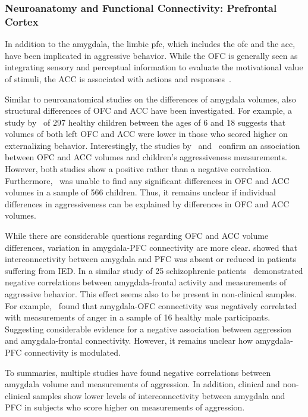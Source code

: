 \subsubsection{Neuroanatomy and Functional Connectivity: Prefrontal Cortex}
\label{ssub:aggression_and_the_prefrontal_cortex}

In addition to the amygdala, the limbic \acrfull{pfc}, which includes the \acrfull{ofc} and the \acrfull{acc}, have been implicated in aggressive behavior.
While the OFC is generally seen as integrating sensory and perceptual information to evaluate the motivational value of stimuli, the ACC is associated with actions and responses~\cite{Rudebeck2014,Walton2007}.

Similar to neuroanatomical studies on the differences of amygdala volumes, also structural differences of OFC and ACC have been investigated.
For example, a study by~\citet{Ameis2014} of $297$ healthy children between the ages of 6 and 18 suggests that volumes of both left OFC and ACC were lower in those who scored higher on externalizing behavior.
Interestingly, the studies by~\citet{Ducharme2011} and~\citet{Boes2008} confirm an association between OFC and ACC volumes and children's aggressiveness measurements.
However, both studies show a positive rather than a negative correlation.
Furthermore,~\citet{Thijssen2015} was unable to find any significant differences in OFC and ACC volumes in a sample of 566 children.
Thus, it remains unclear if individual differences in aggressiveness can be explained by differences in OFC and ACC volumes.

While there are considerable questions regarding OFC and ACC volume differences, variation in amygdala-PFC connectivity are more clear.
\citet{Coccaro2007} showed that interconnectivity between amygdala and PFC was absent or reduced in patients suffering from IED\@.
In a similar study of 25 schizophrenic patients~\citet{Hoptman2010} demonstrated negative correlations between amygdala-frontal activity and measurements of aggressive behavior.
This effect seems also to be present in non-clinical samples.
For example,~\citet{Fulwiler2012} found that amygdala-OFC connectivity was negatively correlated with measurements of anger in a sample of 16 healthy male participants. 
Suggesting considerable evidence for a negative association between aggression and amygdala-frontal connectivity.
However, it remains unclear how amygdala-PFC connectivity is modulated.

To summaries, multiple studies have found negative correlations between amygdala volume and measurements of aggression. 
In addition, clinical and non-clinical samples show lower levels of interconnectivity between amygdala and PFC in subjects who score higher on measurements of aggression.

